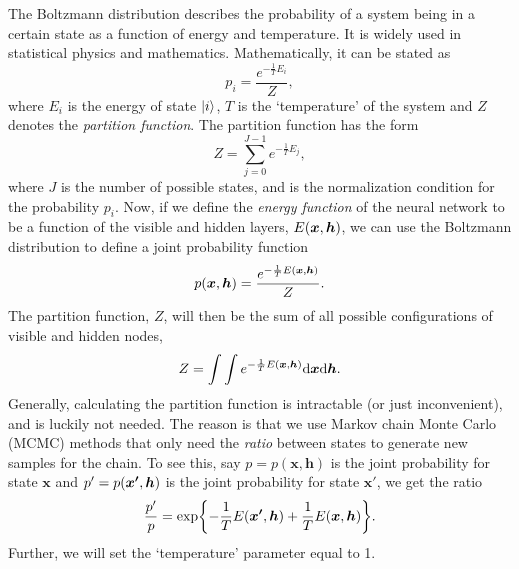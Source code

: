 The Boltzmann distribution describes the probability of a system being in a certain state as a function of energy and temperature. It is widely used in statistical physics and mathematics. Mathematically, it can be stated as 
\begin{equation}\label{eq:boltzmann_dist}
    p_i = \frac{e^{-\frac{1}{T}E_i}}{Z}, 
\end{equation}
where $E_i$ is the energy of state $\ket{i}$, $T$ is the `temperature' of the system and $Z$ denotes the \textit{partition function}. The partition function has the form
\begin{equation*}
    Z = \sum_{j=0}^{J-1} e^{-\frac{1}{T}E_j}, 
\end{equation*}
where $J$ is the number of possible states, and is the normalization condition for the probability $p_i$. Now, if we define the \textit{energy function} of the neural network to be a function of the visible and hidden layers, $E\qty(\bm{x}, \bm{h})$, we can use the Boltzmann distribution to define a joint probability function 
\begin{equation}\label{eq:joint_probability}
    p\qty(\bm{x}, \bm{h}) = \frac{e^{-\frac{1}{T}E\qty(\bm{x}, \bm{h})}}{Z}.
\end{equation}
The partition function, $Z$, will then be the sum of all possible configurations of visible and hidden nodes, 
\begin{equation}\label{eq:partition_function}
    Z = \int\int e^{-\frac{1}{T}E\qty(\bm{x}, \bm{h})}\mathrm{d}\bm{x}\mathrm{d}\bm{h}.
\end{equation}
Generally, calculating the partition function is intractable (or just inconvenient), and is luckily not needed. The reason is that we use Markov chain Monte Carlo (MCMC) methods that only need the \textit{ratio} between states to generate new samples for the chain. To see this, say $p = p(\bm{x}, \bm{h})$ is the joint probability for state $\bm{x}$ and $p' = p\qty(\bm{x'},\bm{h})$ is the joint probability for state $\bm{x'}$, we get the ratio 
\begin{equation*}
    \frac{p'}{p} = \exp{-\frac{1}{T}E\qty(\bm{x'}, \bm{h}) + \frac{1}{T}E\qty(\bm{x}, \bm{h})}. 
\end{equation*}
Further, we will set the `temperature' parameter equal to 1. 

